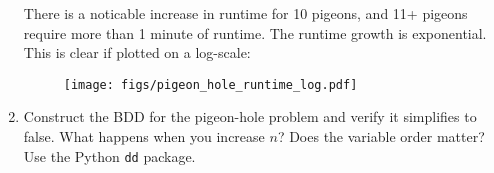 \begin{enumerate}[label=(\alph*)]
        There is a noticable increase in runtime for 10 pigeons, and 11+ pigeons require more than 1 minute of runtime. The runtime growth is exponential. This is clear if plotted on a log-scale:

        \begin{figure}[H]
          \centering
          \texttt{[image: figs/pigeon\_hole\_runtime\_log.pdf]}
        \end{figure}

    \item {\color{blue} Construct the BDD for the pigeon-hole problem and verify it simplifies to false. What happens when you increase $n$? Does the variable order matter? Use the Python \texttt{dd} package.}
\end{enumerate}

